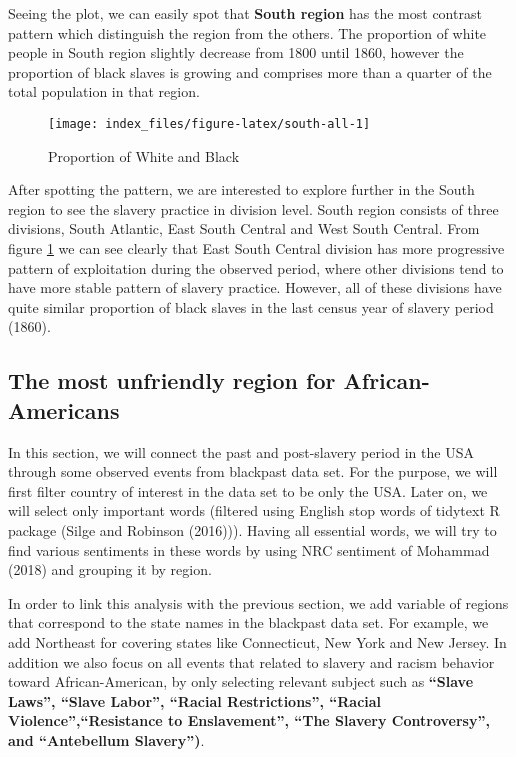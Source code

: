 \documentclass[
]{article}
\begin{document}
Seeing the plot, we can easily spot that \textbf{South region} has the most contrast pattern which distinguish the region from the others. The proportion of white people in South region slightly decrease from 1800 until 1860, however the proportion of black slaves is growing and comprises more than a quarter of the total population in that region.

\begin{figure}

{\centering \texttt{[image: index\_files/figure-latex/south-all-1]} 

}

\caption{Proportion of White and Black}\label{fig:south-all}
\end{figure}

After spotting the pattern, we are interested to explore further in the South region to see the slavery practice in division level. South region consists of three divisions, South Atlantic, East South Central and West South Central.
From figure \ref{fig:south-all} we can see clearly that East South Central division has more progressive pattern of exploitation during the observed period, where other divisions tend to have more stable pattern of slavery practice. However, all of these divisions have quite similar proportion of black slaves in the last census year of slavery period (1860).

\hypertarget{the-most-unfriendly-region-for-african-americans}{%
\subsection{The most unfriendly region for African-Americans}\label{the-most-unfriendly-region-for-african-americans}}

In this section, we will connect the past and post-slavery period in the USA through some observed events from blackpast data set. For the purpose, we will first filter country of interest in the data set to be only the USA. Later on, we will select only important words (filtered using English stop words of tidytext R package (Silge and Robinson (2016))). Having all essential words, we will try to find various sentiments in these words by using NRC sentiment of Mohammad (2018) and grouping it by region.

In order to link this analysis with the previous section, we add variable of regions that correspond to the state names in the blackpast data set. For example, we add Northeast for covering states like Connecticut, New York and New Jersey. In addition we also focus on all events that related to slavery and racism behavior toward African-American, by only selecting relevant subject such as \textbf{``Slave Laws'', ``Slave Labor'', ``Racial Restrictions'', ``Racial Violence'',``Resistance to Enslavement'', ``The Slavery Controversy'', and ``Antebellum Slavery'')}.
\end{document}
